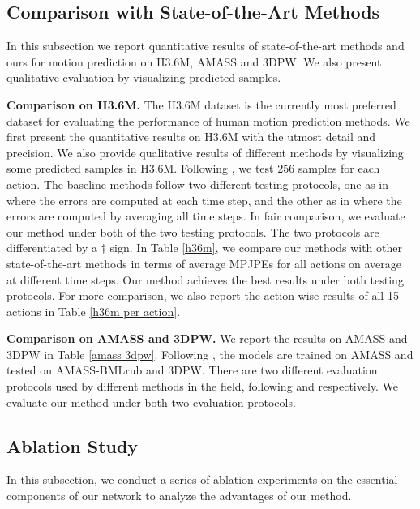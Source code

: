 \documentclass[10pt,twocolumn,letterpaper]{article}
\begin{document}
       





    
\subsection{Comparison with State-of-the-Art Methods}
In this subsection we report quantitative results of state-of-the-art methods and ours for motion prediction on H3.6M, AMASS and 3DPW. We also present qualitative evaluation by visualizing predicted samples.

\noindent
\textbf{Comparison on H3.6M. }
The H3.6M dataset is the currently most preferred dataset for evaluating the performance of human motion prediction methods. We first present the quantitative results on H3.6M with the utmost detail and precision. We also provide qualitative results of different methods by visualizing some predicted samples in H3.6M.
Following \cite{guo2023back}, we test 256 samples for each action. The baseline methods follow two different testing protocols, one as in \cite{mao2020history} where the errors are computed at each time step, and the other as in \cite{sofianos2021space} where the errors are computed by averaging all time steps.
In fair comparison, we evaluate our method under both of the two testing protocols. The two protocols are differentiated by a $\dagger$ sign.
In Table \ref{h36m}, we compare our methods with other state-of-the-art methods in terms of average MPJPEs for all actions on average at different time steps.
Our method achieves the best results under both testing protocols.
For more comparison, we also report the action-wise results of all 15 actions in Table \ref{h36m per action}.



\noindent
\textbf{Comparison on AMASS and 3DPW. }
We report the results on AMASS and 3DPW in Table \ref{amass 3dpw}. Following \cite{guo2023back}, the models are trained on AMASS and tested on AMASS-BMLrub and 3DPW. There are two different evaluation protocols used by different methods in the field, following \cite{sofianos2021space} and \cite{mao2019learning} respectively. We evaluate our method under both two evaluation protocols.











    

\subsection{Ablation Study}
In this subsection, we conduct a series of ablation experiments on the essential components of our network to analyze the advantages of our method.
\end{document}
